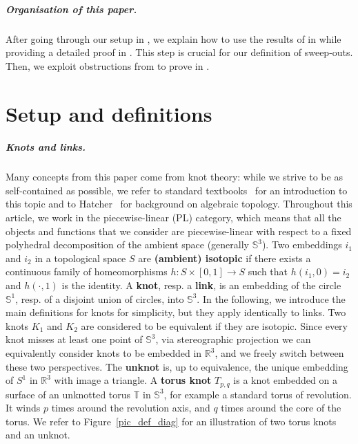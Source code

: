 \documentclass{article}
\newcommand{\To}{\mathbb{T}}
\newcommand{\Sp}{\mathbb{S}}
\begin{document}
\subparagraph*{Organisation of this paper.}
After going through our setup in , we explain how to use the results of \cite{Chambers_homo-isotopy} in  while providing a detailed proof in . This step is crucial for our definition of sweep-outs. Then, we exploit obstructions from \cite{Lunel_spherewidth_out} to prove  in . 


\section{Setup and definitions}\label{sec_prelim}

\subparagraph*{Knots and links.} Many concepts from this paper come from knot theory: while we strive to be as self-contained as possible, we refer to standard textbooks~\cite{burde2002knots,Rolfsen_Knots} for an introduction to this topic and to Hatcher~\cite{Hatcher_Algebraic_Topology} for background on algebraic topology. Throughout this article, we work in the piecewise-linear (PL) category, which means that all the objects and functions that we consider are piecewise-linear with respect to a fixed polyhedral decomposition of the ambient space (generally $\Sp^3$). Two embeddings $i_1$ and $i_2$ in a topological space $S$ are \textbf{(ambient) isotopic} if there exists a continuous family of homeomorphisms $h: S \times[0,1] \rightarrow S$ such that $h (i_1,0) =i_2$ and $h(\cdot,1)$ is the identity. A \textbf{knot}, resp. a \textbf{link}, is an embedding of the circle $\Sp^1$, resp. of a disjoint union of circles, into $\Sp^3$. In the following, we introduce the main definitions for knots for simplicity, but they apply identically to links. Two knots $K_1$ and $K_2$ are considered to be equivalent if they are isotopic. Since every knot misses at least one point of $\Sp^3$, via stereographic projection we can equivalently consider knots to be embedded in $\mathbb{R}^3$, and we freely switch between these two perspectives. The \textbf{unknot} is, up to equivalence, the unique embedding of $S^1$ in $\mathbb{R}^3$ with image a triangle. A \textbf{torus knot} $T_{p,q}$ is a knot embedded on a surface of an unknotted torus $\To$ in $\mathbb{S}^3$, for example a standard torus of revolution. It winds $p$ times around the revolution axis, and $q$ times around the core of the torus. We refer to Figure~\ref{pic_def_diag} for an illustration of two torus knots and an unknot.
\end{document}
